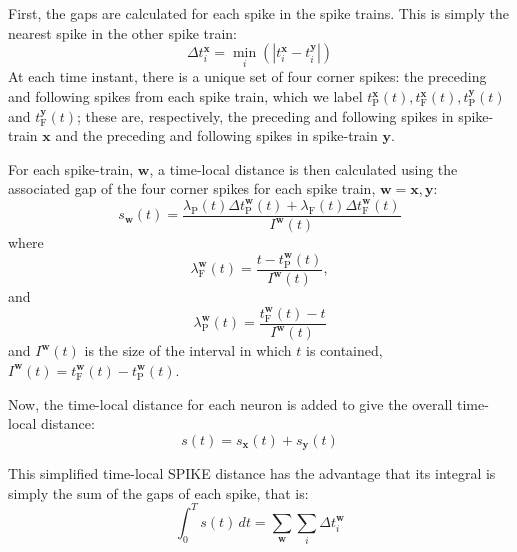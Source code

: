 \documentclass[12pt]{amsart}
\begin{document}
First, the gaps are calculated for each spike in the spike trains.  This is simply the nearest spike in the other spike train:
\begin{equation}
\Delta t_{i}^{\mathbf{x}} = \min_{i} \left( | t_{i}^{\mathbf{x}} - t_i^{\mathbf{y}} | \right)
\end{equation}
 At each time instant, there is a unique set of four corner spikes: the preceding and following spikes from each spike train, which we label $t_{\mathrm{P}}^{\mathbf{x}}(t) ,t_{\mathrm{F}}^{\mathbf{x}}(t) ,t_{\mathrm{P}}^{\mathbf{y}}(t)$ and $t_{\mathrm{F}}^{\mathbf{y}}(t)$; these are, respectively, the preceding and following spikes in spike-train $\mathbf{x}$ and the preceding and following spikes in spike-train $\mathbf{y}$.

For each spike-train, $\mathbf{w}$, a time-local distance is then calculated using the associated gap of the four corner spikes for each spike train, $\mathbf{w}=\mathbf{x},\mathbf{y}$:
\begin{equation}
s_{\mathbf{w}}(t) = \frac{\lambda_{\mathrm{P}}(t)\Delta t_{\mathrm{P}}^{\mathbf{w}}(t)  + \lambda_{\mathrm{F}}(t)\Delta t_{\mathrm{F}}^{\mathbf{w}}(t) }{I^{\mathbf{w}}(t)}%
\end{equation}
where
\begin{equation}
\lambda_{\mathrm{F}}^{\mathbf{w}}(t) = \frac{t-t_{\mathrm{P}}^{\mathbf{w}}(t)}{I^{\mathbf{w}}(t)},%
\end{equation}
and
\begin{equation}
\lambda_{\mathrm{P}}^{\mathbf{w}}(t) = \frac{t_{\mathrm{F}}^{\mathbf{w}}(t) - t}{I^{\mathbf{w}}(t)}%
\end{equation}
and $I^{\mathbf{w}}(t)$ is the size of the interval in which $t$ is contained, $I^{\mathbf{w}}(t) = t_{\mathrm{F}}^{\mathbf{w}}(t) - t_{\mathrm{P}}^{\mathbf{w}}(t)$.

Now, the time-local distance for each neuron is added to give the overall time-local distance:
\begin{equation}
s(t) = s_{\mathbf{x}}(t) + s_{\mathbf{y}}(t)
\end{equation}

This simplified time-local SPIKE distance has the advantage that its integral is simply the sum of the gaps of each spike, that is:
\begin{equation}
\int_{0}^{T} s(t) \,dt = \sum_{\mathbf{w}} \sum_i \Delta t_i^{\mathbf{w}}
\end{equation}
\end{document}
